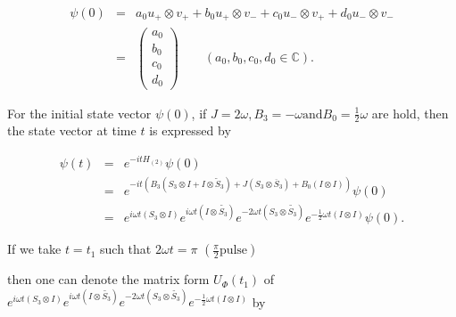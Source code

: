 \begin{eqnarray*}

\psi (0) &=&a_{0}u_{+}\otimes v_{+}+b_{0}u_{+}\otimes

v_{-}+c_{0}u_{-}\otimes v_{+}+d_{0}u_{-}\otimes v_{-} \\

&=&\left( 

\begin{array}{c}

a_{0} \\ 

b_{0} \\ 

c_{0} \\ 

d_{0}%

\end{array}%

\right) \qquad (a_{0},b_{0},c_{0},d_{0}\in \mathbb{C}).

\end{eqnarray*}%

For the initial state vector $\psi (0)$, if $J=2\omega, B_{3}=-\omega %

\mbox{and}B_{0}=\frac{1}{2}\omega $ are hold, then the state vector at time $%

t$ is expressed by 

\begin{eqnarray*}

\psi (t) &=&e^{-itH_{(2)}}\psi (0) \\

&=&e^{-it(B_{3}(S_{3}\otimes I+I\otimes \tilde{S}_{3})+J(S_{3}\otimes 

\overline{S}_{3})+B_{0}(I\otimes I))}\psi (0) \\

&=&e^{i\omega t(S_{3}\otimes I)}e^{i\omega t(I\otimes \tilde{S_{3}}%

)}e^{-2\omega t(S_{3}\otimes \tilde{S_{3}})}e^{-\frac{1}{2}\omega t(I\otimes

I)}\psi (0).

\end{eqnarray*}%

If we take $t=t_{1}$ such that $2\omega t=\pi$ $(\frac{\pi }{2}\mbox{pulse})$

then one can denote the matrix form $U_{\Phi}(t_{1})$ of $e^{i\omega

t(S_{3}\otimes I)}e^{i\omega t(I\otimes \tilde{S_{3}})}e^{-2\omega

t(S_{3}\otimes \tilde{S_{3}})}e^{-\frac{1}{2}\omega t(I\otimes I)}$ by 


